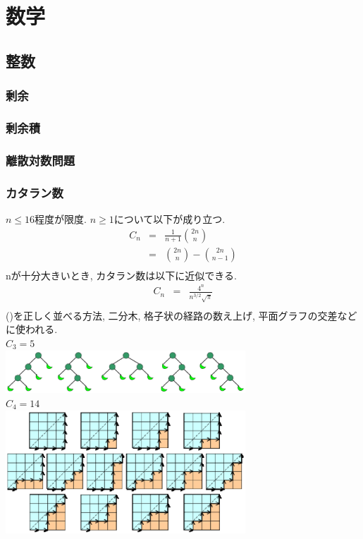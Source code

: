 
\section{数学}
\subsection{整数}
\subsubsection{剰余}


\subsubsection{剰余積}


\subsubsection{離散対数問題}


\subsubsection{カタラン数}
$n\leq 16$程度が限度. $n\geq 1$について以下が成り立つ.
\begin{eqnarray*}
  C_n &=& \frac{1}{n+1}\binom{2n}{n}\\
      &=& \binom{2n}{n}-\binom{2n}{n-1}\\
\end{eqnarray*}
nが十分大きいとき, カタラン数は以下に近似できる.
\begin{eqnarray*}
  C_n &=& \frac{4^n}{n^{3/2}\sqrt{\pi}}\\
\end{eqnarray*}
()を正しく並べる方法, 二分木, 格子状の経路の数え上げ, 平面グラフの交差などに使われる.\\
$C_3=5$\\
\includegraphics[width=9cm, clip]{images/Catalan_tree.eps}\\
$C_4=14$\\
\includegraphics[width=9cm, clip]{images/Catalan_graph.eps}\\

